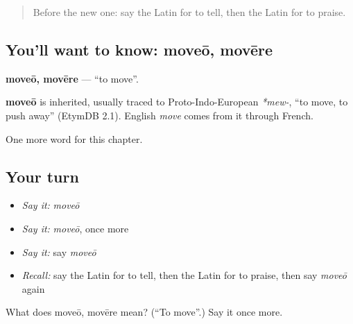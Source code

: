 \label{lesson:LA-C99-moveo}



\begin{quote}
Before the new one: say the Latin for to tell, then the Latin for to praise.
\end{quote}

\subsection*{You'll want to know: moveō, movēre}
\textbf{moveō, movēre} — \textquotedblleft{}to move\textquotedblright{}.

\begin{cousinweb}
\textbf{moveō} is inherited, usually traced to Proto-Indo-European \emph{*mew-}, \textquotedblleft{}to move, to push away\textquotedblright{} (EtymDB 2.1). English \emph{move} comes from it through French.
\end{cousinweb}

\begin{grammarlens}[title={What you've built}]
One more word for this chapter.
\end{grammarlens}

\subsection*{Your turn}
\begin{itemize}
\raggedright
  \item \emph{Say it:} \emph{moveō}
  \item \emph{Say it:} \emph{moveō}, once more
  \item \emph{Say it:} say \emph{moveō}
  \item \emph{Recall:} say the Latin for to tell, then the Latin for to praise, then say \emph{moveō} again
\end{itemize}

\begin{tcolorbox}[breakable,colback=teal!4,colframe=teal!35!black,title={Before you move on}]
What does moveō, movēre mean? (\textquotedblleft{}To move\textquotedblright{}.) Say it once more.
\end{tcolorbox}
